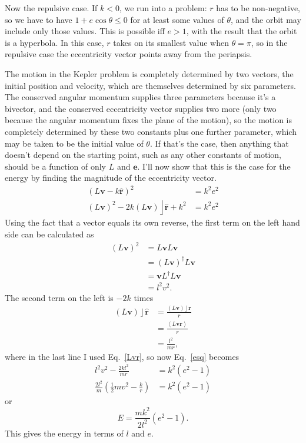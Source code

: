 \documentclass{utarticle}
\DeclareMathOperator{\lin}{\rfloor}
\newcommand{\rev}[1]{\ensuremath{#1^\dagger}}
\newcommand{\grade}[2][]{\ensuremath{\left\langle #2 \right\rangle_{#1}}}
\newcommand{\half}{\ensuremath{\frac{1}{2}}}
\begin{document}
Now the repulsive case.  If $k < 0$, we run into a problem:  $r$ has to be 
non-negative, so we have to have $1 + e\cos\theta \leq 0$ for at least some values 
of $\theta$, and the orbit may include only those values.  This is possible iff 
$e > 1$, with the result that the orbit is a hyperbola.  In this case, $r$ takes on its 
smallest value when $\theta = \pi$, so in the repulsive case the eccentricity vector 
points away from the periapsis.

The motion in the Kepler problem is completely determined by two vectors,
the initial position and velocity, which are themselves determined by six parameters.  
The conserved angular momentum supplies three parameters because it's a bivector, 
and the conserved eccentricity vector supplies two more (only two because the angular
momentum fixes the plane of the motion), so the motion is completely determined 
by these two constants plus one further parameter, which may be taken to be the 
initial value of $\theta$.  If that's the case, then anything that doesn't depend on the 
starting point, such as any other constants of motion, should be a function of only $L$ 
and $\bm{e}$.  I'll now show that this is the case for the energy by finding the magnitude 
of the eccentricity vector.
\begin{align}
(L\bm{v} - k\bm{\hat{r}})^2 & = k^2 e^2 \nonumber \\
(L\bm{v})^2 - 2 k (L\bm{v}) \lin \bm{\hat{r}} + k^2 & = k^2 e^2
\label{esq}
\end{align}
Using the fact that a vector equals its own reverse, the first term on the left 
hand side can be calculated as
\begin{align}
(L\bm{v})^2 & = L\bm{v} L\bm{v} \nonumber \\
            & = \rev{(L\bm{v})}L\bm{v} \nonumber \\
            & = \bm{v}\rev{L}L\bm{v} \nonumber \\
            & = l^2 v^2.
\end{align}
The second term on the left is $-2k$ times
\begin{align}
(L\bm{v}) \lin \bm{\hat{r}} & = \frac{(L\bm{v}) \lin \bm{r}}{r} \nonumber \\
                           & = \frac{\grade{L\bm{v}\bm{r}}}{r} \nonumber \\
                           & = \frac{l^2}{mr},
\end{align}
where in the last line I used Eq.~\eqref{Lvr}, so now Eq.~\eqref{esq} becomes
\begin{align}
l^2 v^2 - \frac{2kl^2}{mr} & = k^2(e^2-1) \nonumber \\
\frac{2l^2}{m}\left(\half mv^2 - \frac{k}{r}\right) & = k^2(e^2-1)
\end{align}
or
\begin{equation}
E = \frac{mk^2}{2l^2}(e^2-1).
\end{equation}
This gives the energy in terms of $l$ and $e$.
\end{document}
